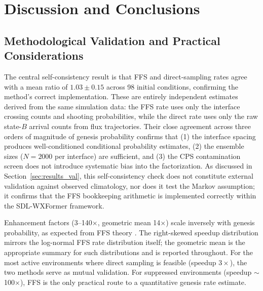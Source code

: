 \documentclass[11pt]{article}
\begin{document}
\section{Discussion and Conclusions}

\subsection{Methodological Validation and Practical Considerations}

The central self-consistency result is that FFS and direct-sampling rates agree with a mean
ratio of $1.03\pm0.15$ across 98 initial conditions, confirming
the method's correct implementation. These are entirely independent estimates derived
from the same simulation data: the FFS rate uses only the interface crossing counts
and shooting probabilities, while the direct rate uses only the raw state-$B$ arrival
counts from flux trajectories.
Their close agreement across three orders of magnitude of genesis probability confirms
that (1) the interface spacing produces well-conditioned conditional probability estimates,
(2) the ensemble sizes ($N=2000$ per interface) are sufficient, and (3) the CPS
contamination screen does not introduce systematic bias into the factorization.
As discussed in Section~\ref{sec:results_val}, this self-consistency check does not
constitute external validation against observed climatology, nor does it test the
Markov assumption; it confirms that the FFS bookkeeping arithmetic is implemented
correctly within the SDL-WXFormer framework.

Enhancement factors (3--140$\times$, geometric mean 14$\times$)
scale inversely with genesis probability, as expected from FFS theory \citep{allen2009forward}.
The right-skewed speedup distribution mirrors the log-normal FFS rate distribution itself;
the geometric mean is the appropriate summary for such distributions and is reported throughout.
For the most active environments where direct sampling is feasible (speedup $3\times$), the two
methods serve as mutual validation. For suppressed environments (speedup $\sim$100$\times$),
FFS is the only practical route to a quantitative genesis rate estimate.
\end{document}
